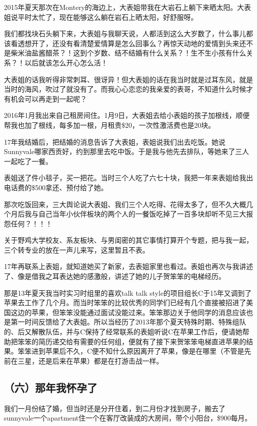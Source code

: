 \documentclass[9pt, b5paper]{article}
\begin{document}
2015年夏天那次在Montery的海边上，大表姐带我在大岩石上躺下来晒太阳。大表姐说平时太忙了，现在能够这么躺在岩石上晒太阳，好舒服呀。

我们都找块石头躺下来，大表姐与我聊天说，人都活到这么大岁数了，什么事儿都该看透想开了，还没有看清楚爱情算是怎么回事么？再惊天动地的爱情到头来还不是柴米油盐酱醋茶？！这到个岁数、结不结婚有什么关系？！生不生小孩有什么关系？！以后就该怎么开心怎么活！

大表姐的话我听得非常刺耳、很讶异！但大表姐的话在我当时就是过耳东风，就是当时的海风，吹过了就没有了。而我心心恋恋的我亲爱的表哥，不知道什么时候才有机会可以再走到一起呢？

2016年1月我出来自己租房间住。1月9日，大表姐去给小表姐的孩子加根线，顺便帮我也加了根线，每多加一根，月租贵\$20，一次性激活费也是20块。 

17年我结婚后，把结婚的消息告诉了大表姐，表姐说我们出去吃饭。她说Sunnyvale哪家西贡好，约到那里去吃中饭。于是我与他先去排队，等她来了三人一起吃了一餐。

表姐送了件小毯子，买一把花。当时三个人吃了六七十块，我把一年来表姐给我出电话费的\$500拿还、预付给了她。

那次吃饭回来，三大舆论说大表姐、我们三个人吃得、花得太多了，但不久大概几个月后我与自己当年小伙伴板块的两个人的一餐饭吃掉了一百多块却听不见三大报怨任何？！！！

关于野鸡大学校友、系友板块、与男闺密的其它事情打算开个专题，把与我一起，三个转专业的放在一声儿来写，这里暂且不表。 

17年再联系上表姐，就知道她买了新家，去表姐家里也看过。表姐也再次与我讲述了、像是借我之耳表达她的感激般，讲述了她的儿子贺笨笨的电梯经历。

那是13年夏天我当时实习时组里的喜欢talk talk style的项目组长C于15年又调到了苹果去工作了几个月。而当时笨笨的比较优秀的同学们已经有几个直接被招进了美国这边的苹果，但笨笨没能通过面试没能过来。笨笨那边关于他同学的消息应该也是第一时间反馈给了大表姐。所以当经历了2013年那个夏天特殊时期、特殊组队的、后又解散队伍，并与C保持了经常联系的表姐听说C在苹果工作后，便请她帮助把笨笨的简历递交给有需要的任何组，便就有了接下来贺笨笨电梯直进苹果的结果。笨笨进到苹果后不久，C便不知什么原因离开了苹果，像是在哪里（不管是先前在三星，还是后来在苹果）都是在打游击战一样。 

\subsection{（六）那年我怀孕了}
\label{sec:org725f45b}

我们一月份结了婚，但当时还是分开住着，到二月份才找到房子，搬去了sunnyvale一个apartment住一个在客厅改装成的大房间，带个小阳台，\$900每月。
\end{document}
